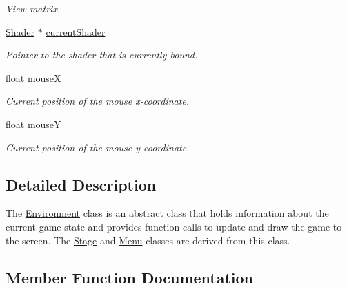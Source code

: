 \begin{DoxyCompactItemize}
\begin{DoxyCompactList}\small\item\em View matrix. \end{DoxyCompactList}\item 
\hyperlink{class_shader}{Shader} $\ast$ \hyperlink{class_environment_aa432f1d0568f9e8c235328a3dc6059ac}{current\+Shader}\hypertarget{class_environment_aa432f1d0568f9e8c235328a3dc6059ac}{}\label{class_environment_aa432f1d0568f9e8c235328a3dc6059ac}

\begin{DoxyCompactList}\small\item\em Pointer to the shader that is currently bound. \end{DoxyCompactList}\item 
float \hyperlink{class_environment_a6feeed21f89f92b386262a105bb40f63}{mouseX}\hypertarget{class_environment_a6feeed21f89f92b386262a105bb40f63}{}\label{class_environment_a6feeed21f89f92b386262a105bb40f63}

\begin{DoxyCompactList}\small\item\em Current position of the mouse x-\/coordinate. \end{DoxyCompactList}\item 
float \hyperlink{class_environment_afeb8f2ac0e33127ef04aa1ae710ef27c}{mouseY}\hypertarget{class_environment_afeb8f2ac0e33127ef04aa1ae710ef27c}{}\label{class_environment_afeb8f2ac0e33127ef04aa1ae710ef27c}

\begin{DoxyCompactList}\small\item\em Current position of the mouse y-\/coordinate. \end{DoxyCompactList}\end{DoxyCompactItemize}


\subsection{Detailed Description}
The \hyperlink{class_environment}{Environment} class is an abstract class that holds information about the current game state and provides function calls to update and draw the game to the screen. The \hyperlink{class_stage}{Stage} and \hyperlink{class_menu}{Menu} classes are derived from this class. 

\subsection{Member Function Documentation}
